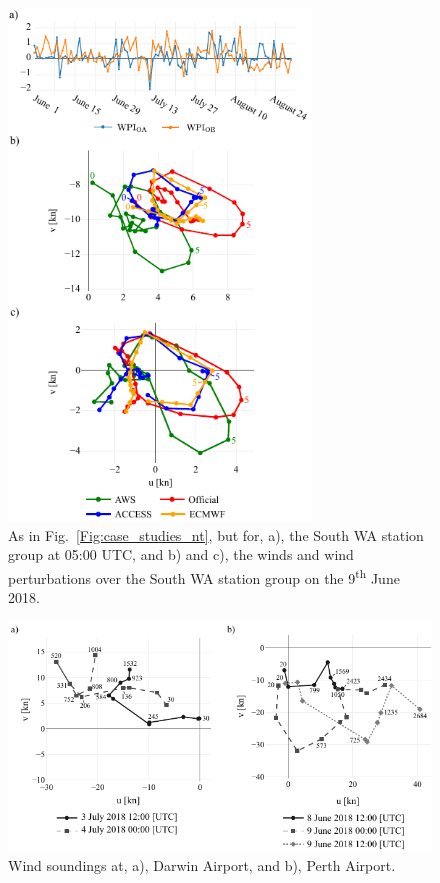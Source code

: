 \documentclass[twocol]{ametsoc}
\begin{document}
\begin{figure}
\centering
\includegraphics[width=19pc]{case_studies_wa.pdf}
\caption{As in Fig.~\ref{Fig:case_studies_nt}, but for, a), the South WA station group at 05:00 UTC, and b) and c), the winds and wind perturbations over the South WA station group on the 9\textsuperscript{th} June 2018.} 
\label{Fig:case_studies_wa}
\end{figure}

\begin{figure}
\centering
\includegraphics[width=33pc]{perth_sounding.pdf}
\caption{Wind soundings at, a), Darwin Airport, and b), Perth Airport.}
\label{Fig:perth_sounding}
\end{figure}
\end{document}
